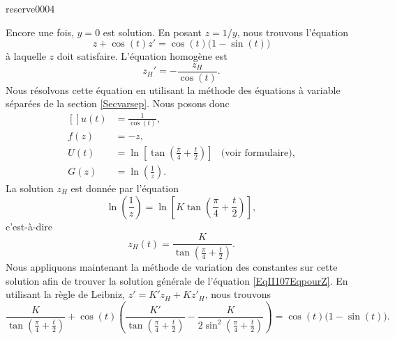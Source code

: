 \begin{corrige}{reserve0004}
\begin{enumerate}
		      Encore une fois, $y=0$ est solution. En posant $z=1/y$, nous trouvons l'équation
		      \begin{equation}		\label{EqII107EqpourZ}
			      z+\cos(t)z'=\cos(t)\big(1-\sin(t)\big)
		      \end{equation}
		      à laquelle $z$ doit satisfaire. L'équation homogène est
		      \begin{equation}
			      z_H'=-\frac{ z_H }{ \cos(t) }.
		      \end{equation}
		      Nous résolvons cette équation en utilisant la méthode des équations à variable séparées de la section \ref{Secvarsep}. Nous posons donc
		      \begin{equation}		\label{EqufUGII107}
			      \begin{aligned}[]
				      u(t) & =\frac{1}{ \cos(t) },                                                                               \\
				      f(z) & =-z,                                                                                                \\
				      U(t) & =\ln\left[ \tan\left( \frac{ \pi }{ 4 }+\frac{ t }{ 2 } \right) \right] & \text{(voir formulaire)}, \\
				      G(z) & =\ln\left( \frac{1}{ z } \right).
			      \end{aligned}
		      \end{equation}
		      La solution $z_H$ est donnée par l'équation
		      \begin{equation}
			      \ln\left( \frac{1}{ z } \right)=\ln\left[ K\tan\left( \frac{ \pi }{ 4 }+\frac{ t }{ 2 } \right) \right],
		      \end{equation}
		      c'est-à-dire
		      \begin{equation}
			      z_H(t)=\frac{ K }{ \tan\left( \frac{ \pi }{ 4 }+\frac{ t }{ 2 } \right) }.
		      \end{equation}
		      Nous appliquons maintenant la méthode de variation des constantes sur cette solution afin de trouver la solution générale de l'équation \eqref{EqII107EqpourZ}. En utilisant la règle de Leibniz, $z'=K'z_H+Kz'_H$, nous trouvons
		      \begin{equation}
			      \frac{ K }{ \tan\left( \frac{ \pi }{ 4 }+\frac{ t }{ 2 } \right) }+\cos(t)\left( \frac{ K' }{  \tan\left( \frac{ \pi }{ 4 }+\frac{ t }{ 2 } \right) }-\frac{ K }{ 2\sin^2 \left( \frac{ \pi }{ 4 }+\frac{ t }{ 2 } \right)  } \right)=\cos(t)\big( 1-\sin(t) \big).
		      \end{equation}

\end{enumerate}
\end{corrige}
